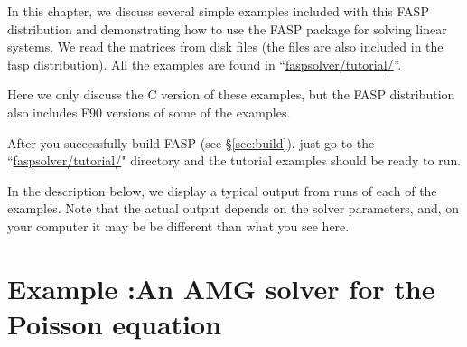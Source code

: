 \documentclass[11pt]{memoir}
\begin{document}
In this chapter, we discuss several simple examples included with this
FASP distribution and demonstrating how to
use the FASP package for solving linear systems. We read the matrices
from disk files (the files are also included in the fasp
distribution). 
All the examples are found in ``\url{faspsolver/tutorial/}''. 

Here we only discuss the C version of these examples, but the FASP
distribution also includes F90 versions of some of the examples. 

After you successfully build FASP (see \S\ref{sec:build}), just go to the
``\url{faspsolver/tutorial/}" directory and the tutorial
examples should be ready to run.

\begin{snugshade}\noindent 
  In the description below, we display a typical output from runs of
  each of the examples.  Note that the actual output depends on the
  solver parameters, and, on your computer it may be be different than
  what you see here.
\end{snugshade}

\setcounter{ex}{1}

\section{Example :An AMG solver for the Poisson equation}\label{sec:ex1}
\addtocounter{ex}{1}
\end{document}
